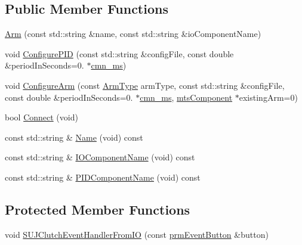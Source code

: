 \subsection*{Public Member Functions}
\begin{DoxyCompactItemize}
\item 
\hyperlink{classmts_intuitive_research_kit_console_1_1_arm_a197d262a8567790b4e1fb1ffa453b1ea}{Arm} (const std\-::string \&name, const std\-::string \&io\-Component\-Name)
\item 
void \hyperlink{classmts_intuitive_research_kit_console_1_1_arm_a46e2678902e140a5cffdfda6257b8c5e}{Configure\-P\-I\-D} (const std\-::string \&config\-File, const double \&period\-In\-Seconds=0. $\ast$\hyperlink{cmn_units_8h_aaf4d3f2fafb9b4a95606544b9d876b4a}{cmn\-\_\-ms})
\item 
void \hyperlink{classmts_intuitive_research_kit_console_1_1_arm_ae61e36de2b7d0201091fa1fb1b726bf2}{Configure\-Arm} (const \hyperlink{classmts_intuitive_research_kit_console_1_1_arm_acb898ba65d323f59ffd0885a47ef6cec}{Arm\-Type} arm\-Type, const std\-::string \&config\-File, const double \&period\-In\-Seconds=0. $\ast$\hyperlink{cmn_units_8h_aaf4d3f2fafb9b4a95606544b9d876b4a}{cmn\-\_\-ms}, \hyperlink{classmts_component}{mts\-Component} $\ast$existing\-Arm=0)
\item 
bool \hyperlink{classmts_intuitive_research_kit_console_1_1_arm_a871bd788c246b3dd77fcde300ffcd7f4}{Connect} (void)
\item 
const std\-::string \& \hyperlink{classmts_intuitive_research_kit_console_1_1_arm_a23ae87d2f48b0d547537e9e1b38b4df6}{Name} (void) const 
\item 
const std\-::string \& \hyperlink{classmts_intuitive_research_kit_console_1_1_arm_ab148bb76eba17d89fabec9b472495e08}{I\-O\-Component\-Name} (void) const 
\item 
const std\-::string \& \hyperlink{classmts_intuitive_research_kit_console_1_1_arm_a2621f6e1b41173a0d76fcfeb0387f98c}{P\-I\-D\-Component\-Name} (void) const 
\end{DoxyCompactItemize}
\subsection*{Protected Member Functions}
\begin{DoxyCompactItemize}
\item 
void \hyperlink{classmts_intuitive_research_kit_console_1_1_arm_a462eba7c555ceb4ad8b475babb3968b2}{S\-U\-J\-Clutch\-Event\-Handler\-From\-I\-O} (const \hyperlink{classprm_event_button}{prm\-Event\-Button} \&button)
\end{DoxyCompactItemize}
